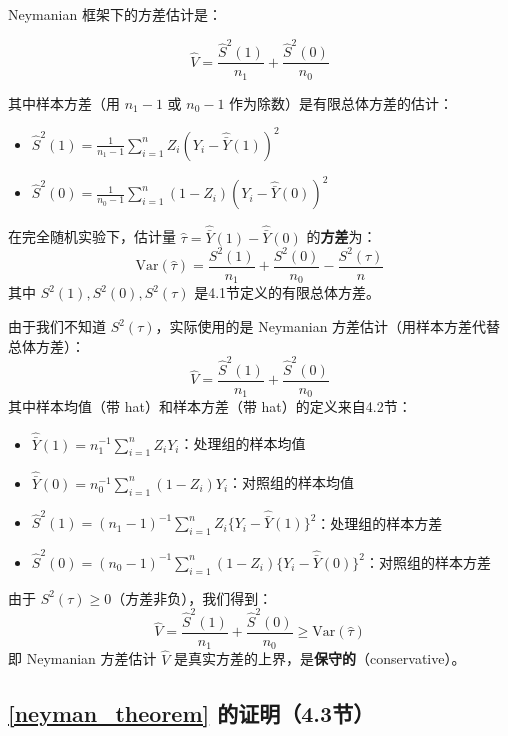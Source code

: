 Neymanian 框架下的方差估计是：

\[
\hat{V} = \frac{\hat{S}^2(1)}{n_1} + \frac{\hat{S}^2(0)}{n_0}
\]

其中样本方差（用 $n_1-1$ 或 $n_0-1$ 作为除数）是有限总体方差的估计：
\begin{itemize}
  \item $\hat{S}^2(1) = \frac{1}{n_1 - 1} \sum_{i=1}^n Z_i (Y_i - \hat{\bar{Y}}(1))^2$
  \item $\hat{S}^2(0) = \frac{1}{n_0 - 1} \sum_{i=1}^n (1-Z_i) (Y_i - \hat{\bar{Y}}(0))^2$
\end{itemize}

\begin{Theorem}\label{neyman_theorem}
在完全随机实验下，估计量 $\hat{\tau} = \hat{\bar{Y}}(1) - \hat{\bar{Y}}(0)$ 的\textbf{方差}为：
\[
\text{Var}(\hat{\tau}) = \frac{S^2(1)}{n_1} + \frac{S^2(0)}{n_0} - \frac{S^2(\tau)}{n}
\]
其中 $S^2(1), S^2(0), S^2(\tau)$ 是4.1节定义的有限总体方差。

由于我们不知道 $S^2(\tau)$，实际使用的是 Neymanian 方差估计（用样本方差代替总体方差）：
\[
\hat{V} = \frac{\hat{S}^2(1)}{n_1} + \frac{\hat{S}^2(0)}{n_0}
\]
其中样本均值（带 hat）和样本方差（带 hat）的定义来自4.2节：
\begin{itemize}
  \item $\hat{\bar{Y}}(1) = n_1^{-1}\sum_{i=1}^n Z_i Y_i$：处理组的样本均值
  \item $\hat{\bar{Y}}(0) = n_0^{-1}\sum_{i=1}^n (1-Z_i) Y_i$：对照组的样本均值
  \item $\hat{S}^2(1) = (n_1-1)^{-1}\sum_{i=1}^n Z_i \{Y_i - \hat{\bar{Y}}(1)\}^2$：处理组的样本方差
  \item $\hat{S}^2(0) = (n_0-1)^{-1}\sum_{i=1}^n (1-Z_i)\{Y_i - \hat{\bar{Y}}(0)\}^2$：对照组的样本方差
\end{itemize}

由于 $S^2(\tau) \geq 0$（方差非负），我们得到：
\[
\hat{V} = \frac{\hat{S}^2(1)}{n_1} + \frac{\hat{S}^2(0)}{n_0} \geq \text{Var}(\hat{\tau})
\]
即 Neymanian 方差估计 $\hat{V}$ 是真实方差的上界，是\textbf{保守的}（conservative）。
\end{Theorem}


\subsection{\cref{neyman_theorem} 的证明（4.3节）}


